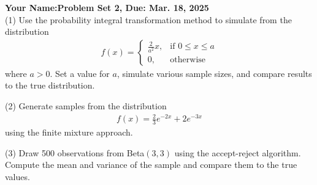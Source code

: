 \documentclass[final,11pt]{article}
\begin{document}
\thispagestyle{empty}
\begin{spacing}{1.25}

\textbf{Your Name:\hfill Problem Set 2, Due: Mar. 18, 2025}\\

(1) Use the probability integral transformation method to simulate from the distribution
\begin{gather}
    f(x) = 
    \begin{cases}
        \frac{2}{a^2}x,  & \text{if }0\leq x\leq a \\
        0, & \text{otherwise}
    \end{cases}
\end{gather}
where $a>0$. Set a value for $a$, simulate various sample sizes, and compare results to the true distribution.

\newpage

(2) Generate samples from the distribution
\begin{gather}
    f(x)=\frac{2}{3}e^{-2x}+2e^{-3x}
\end{gather}
using the finite mixture approach.

\newpage

(3) Draw 500 observations from Beta$(3,3)$ using the accept-reject algorithm. Compute the mean and variance of the sample and compare them to the true values.





\end{spacing}
\end{document}
